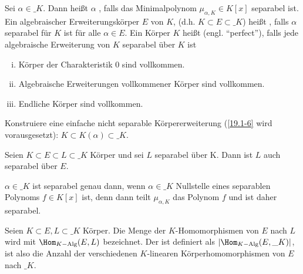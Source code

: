 \begin{df} \label{19.1-9}
	Sei $\alpha \in \_K$.
	Dann heißt $\alpha$ , falls das Minimalpolynom $\mu_{\alpha, K} \in K[x]$ separabel ist.
	Ein algebraischer Erweiterungskörper $E$ von $K$, (d.h. $K \subset E \subset \_K$) heißt , falls $\alpha$ separabel für $K$ ist für alle $\alpha \in E$.
	Ein Körper $K$ heißt  (engl. “perfect”), falls jede algebraische Erweiterung von $K$ separabel über $K$ ist
\end{df}

\setcounter{thm}{5}
\begin{kor} \label{19.1-6}
	\begin{enumerate}[i)]
		\item
			Körper der Charakteristik $0$ sind vollkommen.
		\item
			Algebraische Erweiterungen vollkommener Körper sind vollkommen.
		\item
			Endliche Körper sind vollkommen.
	\end{enumerate}
\end{kor}

\begin{ex} \label{19.1-7}
	Konstruiere eine einfache nicht separable Körpererweiterung (\ref{19.1-6} wird vorausgesetzt): $K \subset K(\alpha) \subset \_K$.
\end{ex}

\begin{lem} \label{19.1-8}
	Seien $K \subset E \subset L \subset \_K$ Körper und sei $L$ separabel über K.
	Dann ist $L$ auch separabel über $E$.
\end{lem}

\begin{nt} \label{19.1-9}
	$\alpha \in \_K$ ist separabel genau dann, wenn $\alpha \in \_K$ Nullstelle eines separablen Polynoms $f \in K[x]$ ist, denn dann teilt $\mu_{\alpha, K}$ das Polynom $f$ und ist daher separabel.
\end{nt}

\begin{df} \label{19.1-10}
	Seien $K \subset E, L \subset \_K$ Körper.
	Die Menge der $K$-Homomorphismen von $E$ nach $L$ wird mit $\Hom_{K-\text{Alg}}(E, L)$ bezeichnet.
	Der  ist definiert als $|\Hom_{K-\text{Alg}}(E, \_K)|$, ist also die Anzahl der verschiedenen $K$-linearen Körperhomomorphismen von $E$ nach $\_K$.
\end{df}


